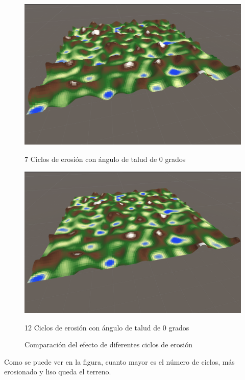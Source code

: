 \begin{figure}[ht]
    \vspace{0.5cm} %
    
    \begin{minipage}{0.35\textwidth}
        \centering
        \includegraphics[width=\textwidth]{img/7ciclos.png}
        \caption{7 Ciclos de erosión con ángulo de talud de 0 grados}
    \end{minipage}%
    \hfill
    \begin{minipage}{0.35\textwidth}
        \centering
        \includegraphics[width=\textwidth]{img/12ciclos.png}
        \caption{12 Ciclos de erosión con ángulo de talud de 0 grados}
    \end{minipage}
    \caption{Comparación del efecto de diferentes ciclos de erosión}
\end{figure}

Como se puede ver en la figura, cuanto mayor es el número de ciclos, más erosionado y liso queda el terreno.

